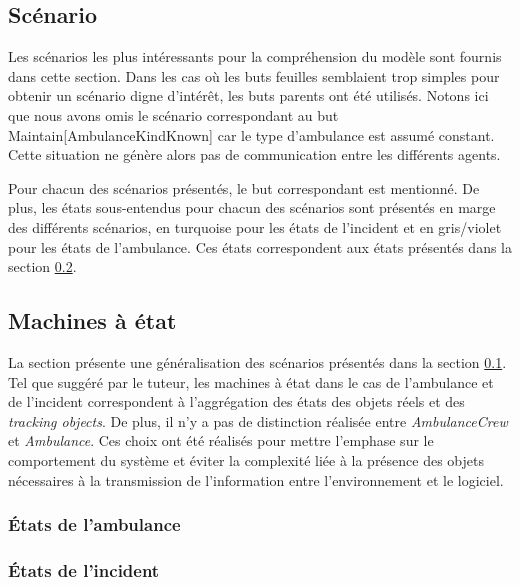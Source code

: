 \subsection{Scénario}
\label{sec:scenario}

Les scénarios les plus intéressants pour la compréhension du modèle sont fournis dans cette section.  Dans les cas où les buts feuilles semblaient trop simples pour obtenir un scénario digne d'intérêt, les buts parents ont été utilisés.  Notons ici que nous avons omis le scénario correspondant au but Maintain[AmbulanceKindKnown] car le type d'ambulance est assumé constant.  Cette situation ne génère alors pas de communication entre les différents agents. 

Pour chacun des scénarios présentés, le but correspondant est mentionné.  De plus, les états sous-entendus pour chacun des scénarios sont présentés en marge des différents scénarios, en turquoise pour les états de l'incident et en gris/violet pour les états de l'ambulance.  Ces états correspondent aux états présentés dans la section \ref{sec:MachineAEtat}.

	
	
	
	
	

\subsection{Machines à état}
\label{sec:MachineAEtat}

La section présente une généralisation des scénarios présentés dans la section \ref{sec:scenario}.   Tel que suggéré par le tuteur,  les machines à état dans le cas de l'ambulance et de l'incident correspondent à l'aggrégation des états des objets réels et des \textit{tracking objects}.  De plus, il n'y a pas de distinction réalisée entre \textit{AmbulanceCrew} et \textit{Ambulance}.  Ces choix ont été réalisés pour mettre l'emphase sur le comportement du système et éviter la complexité liée à la présence des objets nécessaires à la transmission de l'information entre l'environnement et le logiciel.
 	
\subsubsection{États de l'ambulance}

\subsubsection{États de l'incident}
